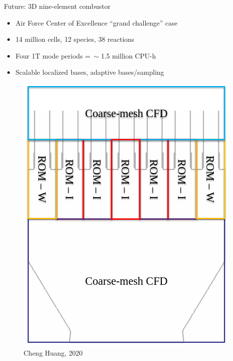 \documentclass[]{beamer}
\begin{document}
\begin{frame}{Future: 3D nine-element combustor\footnotemark[17]}
	\begin{itemize}
		\item Air Force Center of Excellence ``grand challenge'' case
		\item 14 million cells, 12 species, 38 reactions
		\item Four 1T mode periods =$~\sim$1.5 million CPU-h
		\item Scalable localized bases, adaptive bases/sampling
	\end{itemize}
	\begin{minipage}{0.45\linewidth}
		\begin{figure}
		\end{figure}
	\end{minipage}
	\begin{minipage}{0.53\linewidth}
		\centering
		\begin{figure}
			\includegraphics[width=0.55\linewidth]{experiments/9elem/multicomponent.png}
			\caption*{\tiny{Cheng Huang, 2020}}
		\end{figure}
		\vspace{-3em}
	\end{minipage}
\end{frame}
\end{document}

